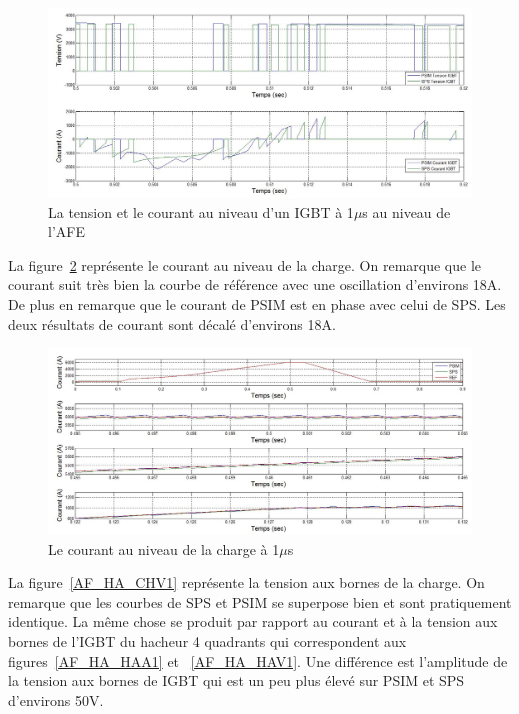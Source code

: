 \documentclass[11pt,letterpaper,final]{report}
\begin{document}
\begin{figure}[htb]
\centering
\includegraphics[scale=0.5]{Fig/Hach_AFE/1u/IGBT_AFE.jpg}
\caption{La tension et le courant au niveau d'un IGBT à 1$\mu$s au niveau de l'AFE}
\label{AF_HA_IGBT1}
\end{figure}

La figure~\ref{AF_HA_CHA1} représente le courant au niveau de la charge. On remarque que le courant suit très bien la courbe de référence avec une oscillation d'environs 18A. De plus en remarque que le courant de PSIM est en phase avec celui de SPS. Les deux résultats de courant sont décalé d'environs 18A. 

\begin{figure}[htb]
\centering
\includegraphics[scale=0.5]{Fig/Hach_AFE/1u/hach_cou_ch.jpg}
\caption{Le courant au niveau de la charge à 1$\mu$s}
\label{AF_HA_CHA1}
\end{figure}


La figure~\ref{AF_HA_CHV1} représente la tension aux bornes de la charge. On remarque que les courbes de SPS et PSIM se superpose bien et sont pratiquement identique. La même chose se produit par rapport au courant et à la tension aux bornes de l'IGBT du hacheur 4 quadrants qui correspondent aux figures~\ref{AF_HA_HAA1} et ~\ref{AF_HA_HAV1}. Une différence est l'amplitude de la tension aux bornes de IGBT qui est un peu plus élevé sur PSIM et SPS d'environs 50V.
\end{document}
